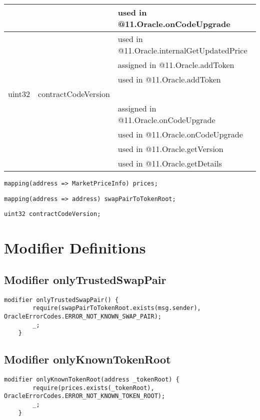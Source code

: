 \begin{tabular}{|l|l|p{5cm}|}
 & & used in @11.Oracle.onCodeUpgrade\\\hline
 & & used in @11.Oracle.internalGetUpdatedPrice\\\hline
 & & assigned in @11.Oracle.addToken\\\hline
 & & used in @11.Oracle.addToken\\\hline
uint32 & contractCodeVersion &  \\\hline
 & & assigned in @11.Oracle.onCodeUpgrade\\\hline
 & & used in @11.Oracle.onCodeUpgrade\\\hline
 & & used in @11.Oracle.getVersion\\\hline
 & & used in @11.Oracle.getDetails\\\hline
\end{tabular}
\fi


\begin{lstlisting}[firstnumber=26]
    mapping(address => MarketPriceInfo) prices;
\end{lstlisting}

\begin{lstlisting}[firstnumber=28]
    mapping(address => address) swapPairToTokenRoot;
\end{lstlisting}

\begin{lstlisting}[firstnumber=31]
    uint32 contractCodeVersion;
\end{lstlisting}

\section{Modifier Definitions}


\subsection{Modifier onlyTrustedSwapPair}


\begin{lstlisting}[firstnumber=198]
    modifier onlyTrustedSwapPair() {
        require(swapPairToTokenRoot.exists(msg.sender), OracleErrorCodes.ERROR_NOT_KNOWN_SWAP_PAIR);
        _;
    }
\end{lstlisting}

\subsection{Modifier onlyKnownTokenRoot}


\begin{lstlisting}[firstnumber=203]
    modifier onlyKnownTokenRoot(address _tokenRoot) {
        require(prices.exists(_tokenRoot), OracleErrorCodes.ERROR_NOT_KNOWN_TOKEN_ROOT);
        _;
    }
\end{lstlisting}

